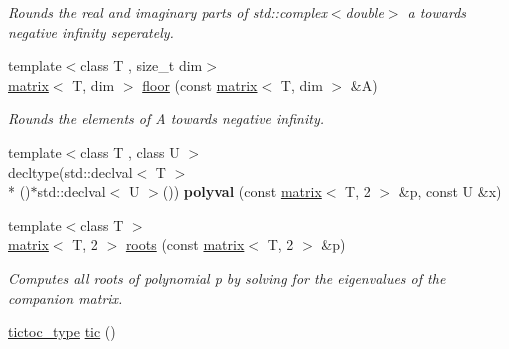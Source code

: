 \begin{DoxyCompactItemize}
\begin{DoxyCompactList}\small\item\em Rounds the real and imaginary parts of std\-::complex$<$double$>$ a towards negative infinity seperately. \end{DoxyCompactList}\item 
\hypertarget{namespacekeycpp_a8aad0f0ac8036ee114a14da17aefcb5f}{{\footnotesize template$<$class T , size\-\_\-t dim$>$ }\\\hyperlink{classkeycpp_1_1matrix}{matrix}$<$ T, dim $>$ \hyperlink{namespacekeycpp_a8aad0f0ac8036ee114a14da17aefcb5f}{floor} (const \hyperlink{classkeycpp_1_1matrix}{matrix}$<$ T, dim $>$ \&A)}\label{namespacekeycpp_a8aad0f0ac8036ee114a14da17aefcb5f}

\begin{DoxyCompactList}\small\item\em Rounds the elements of A towards negative infinity. \end{DoxyCompactList}\item 
\hypertarget{namespacekeycpp_ad5d215fa6882ff492cec0c3958fabadb}{{\footnotesize template$<$class T , class U $>$ }\\decltype(std\-::declval$<$ T $>$\\*
()$\ast$std\-::declval$<$ U $>$()) {\bfseries polyval} (const \hyperlink{classkeycpp_1_1matrix}{matrix}$<$ T, 2 $>$ \&p, const U \&x)}\label{namespacekeycpp_ad5d215fa6882ff492cec0c3958fabadb}

\item 
\hypertarget{namespacekeycpp_a11ba1fe24c04df74326c1289f82fe980}{{\footnotesize template$<$class T $>$ }\\\hyperlink{classkeycpp_1_1matrix}{matrix}$<$ T, 2 $>$ \hyperlink{namespacekeycpp_a11ba1fe24c04df74326c1289f82fe980}{roots} (const \hyperlink{classkeycpp_1_1matrix}{matrix}$<$ T, 2 $>$ \&p)}\label{namespacekeycpp_a11ba1fe24c04df74326c1289f82fe980}

\begin{DoxyCompactList}\small\item\em Computes all roots of polynomial p by solving for the eigenvalues of the companion matrix. \end{DoxyCompactList}\item 
\hypertarget{namespacekeycpp_a6069a9eec0edfa1d401230013d98765e}{\hyperlink{structkeycpp_1_1tictoc__type}{tictoc\-\_\-type} \hyperlink{namespacekeycpp_a6069a9eec0edfa1d401230013d98765e}{tic} ()}\label{namespacekeycpp_a6069a9eec0edfa1d401230013d98765e}


\end{DoxyCompactItemize}
